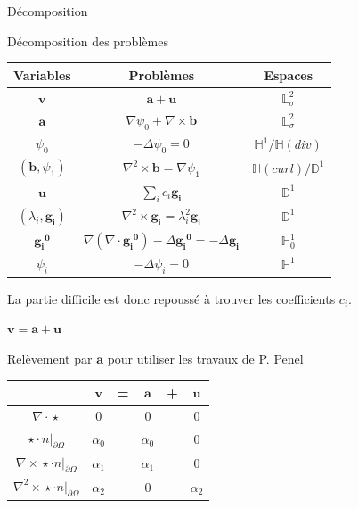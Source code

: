 \documentclass{beamer}
\newcommand{\LL}{{\mathbb{L}}}
\newcommand{\HH}{{\mathbb{H}}}
\newcommand{\DD}{{\mathbb{D}}}
\newcommand{\grad}{{\nabla}}
\newcommand{\laplace}{{\Delta}}
\newcommand{\rot}{{\nabla\times}}
\newcommand{\rott}{{\nabla^2\times}}
\newcommand{\diverg}{{\nabla\cdot}}
\newcommand{\restr}{{\big\rvert_{\partial\Omega}}}
\begin{document}
\begin{frame}{Décomposition}
\begin{block}{Décomposition des problèmes}
\begin{center}
\begin{tabular}{|c|c|c|}
\hline
Variables & Problèmes & Espaces\\ \hline
$\mathbf{v}$ & $\mathbf{a} + \mathbf{u}$ & $\LL^2_\sigma$\\ \hline
$\mathbf{a}$ & $\grad\psi_0 + \rot \mathbf{b}$ & $\LL^2_\sigma$\\ \hline
$\psi_0$ & $-\laplace\psi_0 = 0$ & $\HH^1/\HH(div)$\\ \hline
$(\mathbf{b},\psi_1)$ & $\rott \mathbf{b}= \grad\psi_1$ & $\HH(curl)/\DD^1$ \\ \hline
$\mathbf{u}$ & $\sum_i c_i\mathbf{g_i}$ & $\DD^1$\\ \hline
$(\lambda_i,\mathbf{g_i})$ & $\rott  \mathbf{g_i} = \lambda_i^2 \mathbf{g_i}$ & $\DD^1$ \\ \hline
$\mathbf{\mathbf{g_i}^0}$ & $\grad(\diverg \mathbf{\mathbf{g_i}^0}) - \laplace \mathbf{\mathbf{g_i}^0} = - \laplace \mathbf{g_i}$ & $\HH^1_0$\\ \hline
$\psi_i$ & $-\laplace \psi_i = 0$ & $\HH^1$\\ \hline
\end{tabular}
\end{center}
La partie difficile est donc repoussé à trouver les coefficients $c_i$. 
\end{block}
\end{frame}

\begin{frame}{$\mathbf{v}=\mathbf{a}+\mathbf{u}$}
\begin{block}{Relèvement par $\mathbf{a}$ pour utiliser les travaux de P. Penel}
\begin{center}
\begin{tabular}{c|ccccc}
& $\mathbf{v}$ & = & $\mathbf{a}$ & + & $\mathbf{u}$ \\ \hline
$\diverg\star$ & 0 & & 0 & & 0\\ \hline
$\star\cdot n\restr$ & $\alpha_0$ & & $\alpha_0$ & & 0\\ \hline
$\rot\star\cdot n\restr$ & $\alpha_1$ & & $\alpha_1$ & & 0\\\hline
$\rott\star\cdot n\restr$ & $\alpha_2$ & & 0 & & $\alpha_2$ 
\end{tabular}
\end{center}
\end{block}
\end{frame}
\end{document}
